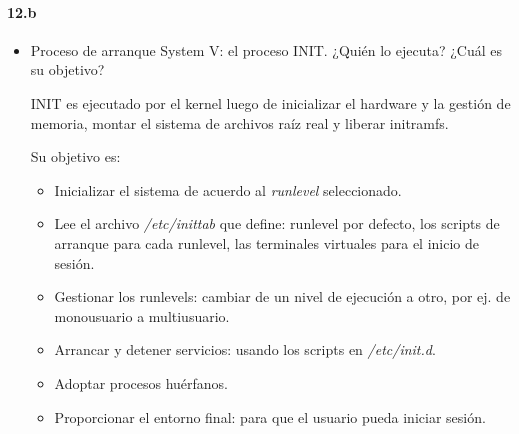 \documentclass[10pt,a4paper]{paper}
\begin{document}
	
	
	\paragraph{12.b}
	\begin{itemize}
		
		\item {Proceso de arranque System V:} el proceso INIT. ¿Quién lo ejecuta? ¿Cuál es su objetivo?
		
		INIT es ejecutado por el kernel luego de inicializar el hardware y la gestión de memoria, montar el sistema de archivos raíz real y liberar initramfs.
		
		Su objetivo es:
		
		\begin{itemize}
			\item Inicializar el sistema de acuerdo al \textit{runlevel} seleccionado.
			
			\item Lee el archivo \textit{/etc/inittab} que define: runlevel por defecto, los scripts de arranque para cada runlevel, las terminales virtuales para el inicio de sesión.
			
			\item Gestionar los runlevels:  cambiar de un nivel de ejecución a otro, por ej. de monousuario a multiusuario.
			
			\item Arrancar y detener servicios: usando los scripts en \textit{/etc/init.d}.
			
			\item Adoptar procesos huérfanos.
			
			\item Proporcionar el entorno final: para que el usuario pueda iniciar sesión.
			
		\end{itemize}
		
	\end{itemize}
	
	
\end{document}
